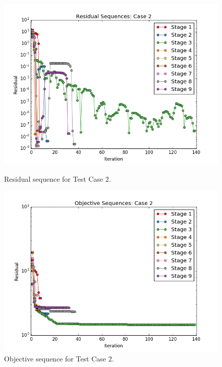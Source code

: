 \documentclass[]{aiaa-tc}%
\begin{document}
\begin{figure}[!ht]
\centering
\begin{minipage}{.50\textwidth}
 \centering
 \includegraphics[width=.8\textwidth]{../images/residual_case2}
 \caption{Residual sequence for Test Case 2.}
 \label{fig:residual_case2}
\end{minipage}%
\begin{minipage}{.50\textwidth}
 \centering
 \includegraphics[width=.8\textwidth]{../images/objective_case2}
 \caption{Objective sequence for Test Case 2.}
 \label{fig:objective_case2}
\end{minipage}
\end{figure}
\end{document}
